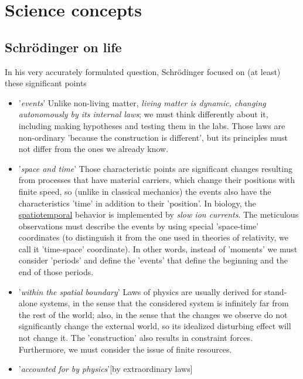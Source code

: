 

\section{Science concepts\label{sec:Physics_ScienceConcepts}\label{sec:Physics-Abstraction}}


\subsection{Schrödinger on life\label{Physics-SchrödingerOnLife}}


In his very accurately formulated question, 
Schrödinger focused on (at least) these significant points
\begin{itemize}
\item '\textit{events}'  Unlike non-living matter, \textit{living matter is dynamic, changing autonomously by its internal laws}; we must think differently about it, including making hypotheses and testing them in the labs.
Those laws are non-ordinary 'because the construction is different', but its principles must not differ from the ones we already know.
\item '\textit{space and time}' Those characteristic points are significant changes resulting from processes that have material carriers,
which change their positions with finite speed, so (unlike in classical mechanics) the events also have the characteristics 'time' in addition to their 'position'.
In biology, the \hyperlink{spatiotemporal}{spatiotemporal} behavior is implemented by \textit{slow ion currents}.
The meticulous observations must describe the events by using 
special 'space-time' coordinates (to distinguish it from the one used in
theories of relativity, we call it 'time-space' coordinate).
In other words, instead of 'moments' we must consider 'periods'
and define the 'events' that define the beginning and the end of those periods.
\item '\textit{within the spatial boundary}'
Laws of physics are usually derived for stand-alone systems, in the sense that
the considered system is infinitely far from the rest of the world; also, in the sense that the changes we observe do not significantly change the external world, so its idealized disturbing effect will not change it.
The 'construction' also results in constraint forces. Furthermore,  we must consider the issue of finite resources.
\item '\textit{accounted for by physics}'[by extraordinary laws]

\end{itemize}
